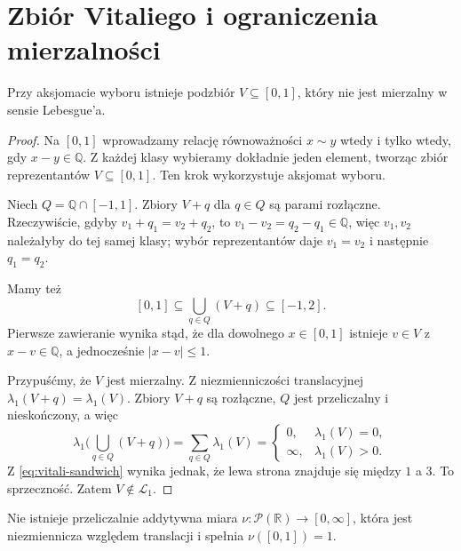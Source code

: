 \section{Zbiór Vitaliego i ograniczenia mierzalności}

\begin{twierdzenie}
\label{thm:vitali}
Przy aksjomacie wyboru istnieje podzbiór
$V\subseteq[0,1]$, który nie jest mierzalny
w sensie Lebesgue'a.
\end{twierdzenie}

\begin{proof}
Na $[0,1]$ wprowadzamy relację równoważności
$x\sim y$ wtedy i tylko wtedy, gdy $x-y\in\mathbb Q$.
Z każdej klasy wybieramy dokładnie jeden element,
tworząc zbiór reprezentantów $V\subseteq[0,1]$.
Ten krok wykorzystuje aksjomat wyboru.

Niech $Q=\mathbb Q\cap[-1,1]$. Zbiory $V+q$ dla
$q\in Q$ są parami rozłączne. Rzeczywiście, gdyby
$v_1+q_1=v_2+q_2$, to
$v_1-v_2=q_2-q_1\in\mathbb Q$, więc $v_1,v_2$
należałyby do tej samej klasy; wybór reprezentantów
daje $v_1=v_2$ i następnie $q_1=q_2$.

Mamy też
\begin{equation}\label{eq:vitali-sandwich}
[0,1]\subseteq\bigcup_{q\in Q}(V+q)\subseteq[-1,2].
\end{equation}
Pierwsze zawieranie wynika stąd, że dla dowolnego
$x\in[0,1]$ istnieje $v\in V$ z $x-v\in\mathbb Q$,
a jednocześnie $|x-v|\le1$.

Przypuśćmy, że $V$ jest mierzalny. Z niezmienniczości
translacyjnej $\lambda_1(V+q)=\lambda_1(V)$.
Zbiory $V+q$ są rozłączne, $Q$ jest przeliczalny i
nieskończony, a więc
\[
\lambda_1\Big(\bigcup_{q\in Q}(V+q)\Big)
=\sum_{q\in Q}\lambda_1(V)
=\begin{cases}0,&\lambda_1(V)=0,\\
\infty,&\lambda_1(V)>0.
\end{cases}
\]
Z \eqref{eq:vitali-sandwich} wynika jednak, że lewa
strona znajduje się między $1$ a $3$. To sprzeczność.
Zatem $V\notin\mathcal L_1$.
\end{proof}

\begin{wniosek}
\label{cor:no-all-subsets-invariant}
Nie istnieje przeliczalnie addytywna miara
$\nu:\mathcal P(\mathbb R)\to[0,\infty]$, która
jest niezmiennicza względem translacji i spełnia
$\nu([0,1])=1$.
\end{wniosek}

